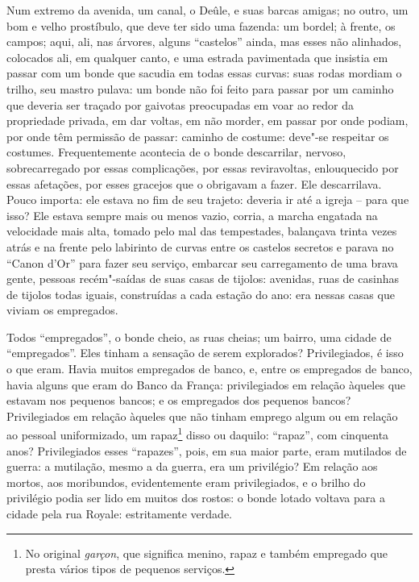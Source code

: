 Num extremo da avenida, um canal, o Deûle, e suas barcas amigas; no
outro, um bom e velho prostíbulo, que deve ter sido uma fazenda: um
bordel; à frente, os campos; aqui, ali, nas árvores, alguns ``castelos''
ainda, mas esses não alinhados, colocados ali, em qualquer canto, e uma
estrada pavimentada que insistia em passar com um bonde que sacudia em
todas essas curvas: suas rodas mordiam o trilho, seu mastro pulava: um
bonde não foi feito para passar por um caminho que deveria ser traçado
por gaivotas preocupadas em voar ao redor da propriedade privada, em dar
voltas, em não morder, em passar por onde podiam, por onde têm permissão
de passar: caminho de costume: deve"-se respeitar os costumes.
Frequentemente acontecia de o bonde descarrilar, nervoso, sobrecarregado
por essas complicações, por essas reviravoltas, enlouquecido por essas
afetações, por esses gracejos que o obrigavam a fazer. Ele descarrilava.
Pouco importa: ele estava no fim de seu trajeto: deveria ir até a igreja
-- para que isso? Ele estava sempre mais ou menos vazio, corria, a
marcha engatada na velocidade mais alta, tomado pelo mal das
tempestades, balançava trinta vezes atrás e na frente pelo labirinto de
curvas entre os castelos secretos e parava no ``Canon d'Or'' para fazer
seu serviço, embarcar seu carregamento de uma brava gente, pessoas
recém"-saídas de suas casas de tijolos: avenidas, ruas de casinhas de
tijolos todas iguais, construídas a cada estação do ano: era nessas
casas que viviam os empregados.

Todos ``empregados'', o bonde cheio, as ruas cheias; um bairro, uma
cidade de ``empregados''. Eles tinham a sensação de serem explorados?
Privilegiados, é isso o que eram. Havia muitos empregados de banco, e,
entre os empregados de banco, havia alguns que eram do Banco da França:
privilegiados em relação àqueles que estavam nos pequenos bancos; e os
empregados dos pequenos bancos? Privilegiados em relação àqueles que não
tinham emprego algum ou em relação ao pessoal uniformizado, um
rapaz\footnote{No original \emph{garçon}, que significa menino, rapaz e
  também empregado que presta vários tipos de pequenos serviços.} disso
ou daquilo: ``rapaz'', com cinquenta anos? Privilegiados esses
``rapazes'', pois, em sua maior parte, eram mutilados de guerra: a
mutilação, mesmo a da guerra, era um privilégio? Em relação aos mortos,
aos moribundos, evidentemente eram privilegiados, e o brilho do
privilégio podia ser lido em muitos dos rostos: o bonde lotado voltava
para a cidade pela rua Royale: estritamente verdade.

